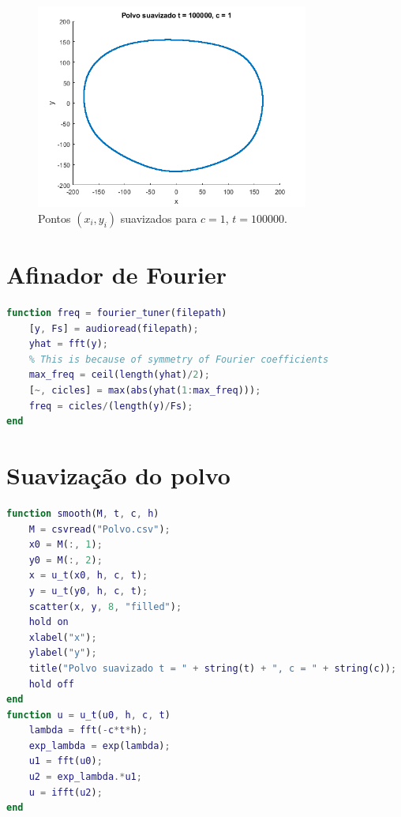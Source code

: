 \documentclass{article}
\begin{document}
\begin{enumerate}
\begin{enumerate}
                        \begin{figure}[!h]
                            \centering
                            \includegraphics[width=0.8\textwidth]{t_100000.png}
                            \caption{Pontos $(x_i, y_i)$ suavizados para $c = 1$, $t = 100000$.}
                            \label{fig:t_100000}
                        \end{figure}

                \end{enumerate}
        \end{enumerate}

    \clearpage

    \appendix

        \section{Afinador de Fourier}
            \label{appendix:tuner}

            \begin{lstlisting}[language=Matlab]
function freq = fourier_tuner(filepath)
    [y, Fs] = audioread(filepath);
    yhat = fft(y);
    % This is because of symmetry of Fourier coefficients
    max_freq = ceil(length(yhat)/2);
    [~, cicles] = max(abs(yhat(1:max_freq)));
    freq = cicles/(length(y)/Fs);
end
            \end{lstlisting}

        \section{Suavização do polvo}
            \label{appendix:octopus}

            \begin{lstlisting}[language=Matlab]
function smooth(M, t, c, h)
    M = csvread("Polvo.csv");
    x0 = M(:, 1);
    y0 = M(:, 2);
    x = u_t(x0, h, c, t);
    y = u_t(y0, h, c, t);
    scatter(x, y, 8, "filled");
    hold on
    xlabel("x");
    ylabel("y");
    title("Polvo suavizado t = " + string(t) + ", c = " + string(c));
    hold off
end
function u = u_t(u0, h, c, t)
    lambda = fft(-c*t*h);
    exp_lambda = exp(lambda);
    u1 = fft(u0);
    u2 = exp_lambda.*u1;
    u = ifft(u2);
end
            \end{lstlisting}
\end{document}
